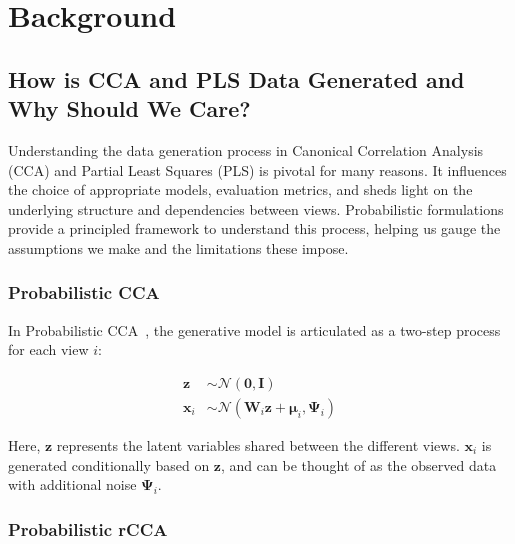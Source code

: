 \section{Background}\label{sec:background}

\subsection{How is CCA and PLS Data Generated and Why Should We Care?}\label{sec:how-is-cca-and-pls-data-generated-and
-why-should-we-care?}

Understanding the data generation process in Canonical Correlation Analysis (CCA) and Partial Least Squares (PLS) is pivotal for many reasons. It influences the choice of appropriate models, evaluation metrics, and sheds light on the underlying structure and dependencies between views. Probabilistic formulations provide a principled framework to understand this process, helping us gauge the assumptions we make and the limitations these impose.

\subsubsection{Probabilistic CCA}

In Probabilistic CCA~\cite{bach2005probabilistic}, the generative model is articulated as a two-step process for each view \(i\):

\begin{align}
    \mathbf{z}& \sim \mathcal{N}(\mathbf{0}, \mathbf{I})                                            \\
    \mathbf{x}_i & \sim \mathcal{N}(\mathbf{W}_i \mathbf{z} + \boldsymbol{\mu}_i, \boldsymbol{\Psi}_i)
\end{align}

Here, \(\mathbf{z}\) represents the latent variables shared between the different views. \(\mathbf{x}_i\) is generated conditionally based on \(\mathbf{z}\), and can be thought of as the observed data with additional noise \(\boldsymbol{\Psi}_i\).


\subsubsection{Probabilistic rCCA}

